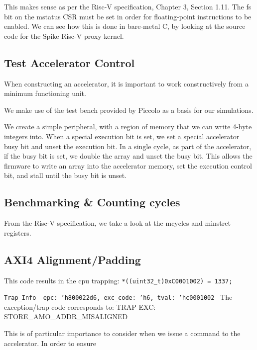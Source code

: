 \documentclass[a4paper,9pt]{report}
\begin{document}
This makes sense as per the Risc-V specification, Chapter 3, Section 1.11.
The fs bit on the mstatus CSR must be set in order for floating-point
instructions to be enabled. We can see how this is done in bare-metal C, by
looking at the source code for the Spike Risc-V proxy kernel.


\subsection{Test Accelerator Control}
When constructing an accelerator, it is important to work constructively from a minimum
functioning unit.

We make use of the test bench provided by Piccolo as a basis for our
simulations.

We create a simple peripheral, with a region of memory that we can write 4-byte
integers into. When a special execution bit is set, we set a special accelerator
busy bit and unset the execution bit. In a single cycle, as part of the
accelerator, if the busy bit is set, we double the array and unset the busy bit.
This allows the firmware to write an array into the accelerator memory, set the
execution control bit, and stall until the busy bit is unset.


\subsection{Benchmarking \& Counting cycles}
From the Risc-V specification, we take a look at the mcycles and minstret
registers.

\subsection{AXI4 Alignment/Padding}

This code results in the cpu trapping:
\texttt{*((uint32\_t\*)0xC0001002) = 1337;}

\texttt{Trap\_Info { epc: 'h800022d6, exc\_code: 'h6, tval: 'hc0001002 }}
The exception/trap code corresponds to:
TRAP EXC: STORE\_AMO\_ADDR\_MISALIGNED

This is of particular importance to consider when we issue a command to the
accelerator. In order to ensure 
\end{document}
